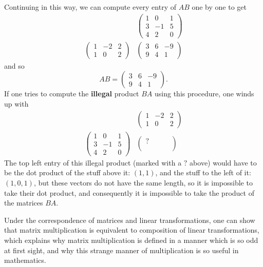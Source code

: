\documentclass[12pt]{article}
\begin{document}
Continuing in this way, we can compute every entry of $AB$ one by one to
get
$$
\begin{matrix}
& \begin{pmatrix}
1 & 0 & 1 \\
3 & -1 & 5 \\
4 & 2 & 0
\end{pmatrix}
\\
\begin{pmatrix}
1 & -2 & 2 \\
1 & 0 & 2
\end{pmatrix} &
\begin{pmatrix}
3 & 6 & -9 \\
9 & 4 & 1
\end{pmatrix}
\end{matrix}
$$
and so
$$
AB = \begin{pmatrix}
3 & 6 & -9 \\
9 & 4 & 1
\end{pmatrix}.
$$
If one tries to compute the {\bf illegal} product $BA$ using this
procedure, one winds up with
$$
\begin{matrix}
& \begin{pmatrix}
1 & -2 & 2 \\
1 & 0 & 2
\end{pmatrix} \\
\begin{pmatrix}
1 & 0 & 1 \\
3 & -1 & 5 \\
4 & 2 & 0
\end{pmatrix} &
\begin{pmatrix}
?\ &\ \ & \ \ \\
\ \ &\ \ & \ \ \\
\ \ &\ \ & \ \
\end{pmatrix}
\end{matrix}
$$
The top left entry of this illegal product (marked with a $?$ above)
would have to be the dot product of the stuff above it: $(1,1)$, and the
stuff to the left of it: $(1,0,1)$, but these vectors do not have the same
length, so it is impossible to take their dot product, and consequently
it is impossible to take the product of the matrices $BA$.

Under the correspondence of matrices and linear transformations, one can
show that matrix multiplication is equivalent to composition of linear
transformations, which explains why matrix multiplication is
defined in a manner which is so odd at first sight, and why this strange
manner of multiplication is so useful in mathematics.
\end{document}
